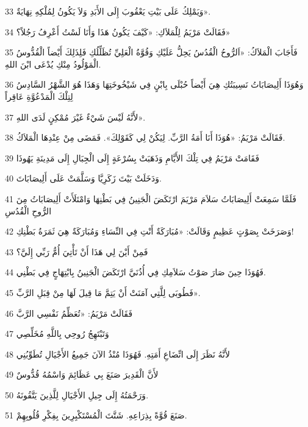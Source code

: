 \par 33 وَيَمْلِكُ عَلَى بَيْتِ يَعْقُوبَ إِلَى الأَبَدِ وَلاَ يَكُونُ لِمُلْكِهِ نِهَايَةٌ».
\par 34 فَقَالَتْ مَرْيَمُ لِلْمَلاَكِ: «كَيْفَ يَكُونُ هَذَا وَأَنَا لَسْتُ أَعْرِفُ رَجُلاً؟»
\par 35 فَأَجَابَ الْمَلاَكُ: «اَلرُّوحُ الْقُدُسُ يَحِلُّ عَلَيْكِ وَقُوَّةُ الْعَلِيِّ تُظَلِّلُكِ فَلِذَلِكَ أَيْضاً الْقُدُّوسُ الْمَوْلُودُ مِنْكِ يُدْعَى ابْنَ اللهِ.
\par 36 وَهُوَذَا أَلِيصَابَاتُ نَسِيبَتُكِ هِيَ أَيْضاً حُبْلَى بِابْنٍ فِي شَيْخُوخَتِهَا وَهَذَا هُوَ الشَّهْرُ السَّادِسُ لِتِلْكَ الْمَدْعُوَّةِ عَاقِراً
\par 37 لأَنَّهُ لَيْسَ شَيْءٌ غَيْرَ مُمْكِنٍ لَدَى اللهِ».
\par 38 فَقَالَتْ مَرْيَمُ: «هُوَذَا أَنَا أَمَةُ الرَّبِّ. لِيَكُنْ لِي كَقَوْلِكَ». فَمَضَى مِنْ عِنْدِهَا الْمَلاَكُ.
\par 39 فَقَامَتْ مَرْيَمُ فِي تِلْكَ الأَيَّامِ وَذَهَبَتْ بِسُرْعَةٍ إِلَى الْجِبَالِ إِلَى مَدِينَةِ يَهُوذَا
\par 40 وَدَخَلَتْ بَيْتَ زَكَرِيَّا وَسَلَّمَتْ عَلَى أَلِيصَابَاتَ.
\par 41 فَلَمَّا سَمِعَتْ أَلِيصَابَاتُ سَلاَمَ مَرْيَمَ ارْتَكَضَ الْجَنِينُ فِي بَطْنِهَا وَامْتَلَأَتْ أَلِيصَابَاتُ مِنَ الرُّوحِ الْقُدُسِ
\par 42 وَصَرَخَتْ بِصَوْتٍ عَظِيمٍ وَقَالَتْ: «مُبَارَكَةٌ أَنْتِ فِي النِّسَاءِ وَمُبَارَكَةٌ هِيَ ثَمَرَةُ بَطْنِكِ!
\par 43 فَمِنْ أَيْنَ لِي هَذَا أَنْ تَأْتِيَ أُمُّ رَبِّي إِلَيَّ؟
\par 44 فَهُوَذَا حِينَ صَارَ صَوْتُ سَلاَمِكِ فِي أُذُنَيَّ ارْتَكَضَ الْجَنِينُ بِابْتِهَاجٍ فِي بَطْنِي.
\par 45 فَطُوبَى لِلَّتِي آمَنَتْ أَنْ يَتِمَّ مَا قِيلَ لَهَا مِنْ قِبَلِ الرَّبِّ».
\par 46 فَقَالَتْ مَرْيَمُ: «تُعَظِّمُ نَفْسِي الرَّبَّ
\par 47 وَتَبْتَهِجُ رُوحِي بِاللَّهِ مُخَلِّصِي
\par 48 لأَنَّهُ نَظَرَ إِلَى اتِّضَاعِ أَمَتِهِ. فَهُوَذَا مُنْذُ الآنَ جَمِيعُ الأَجْيَالِ تُطَوِّبُنِي
\par 49 لأَنَّ الْقَدِيرَ صَنَعَ بِي عَظَائِمَ وَاسْمُهُ قُدُّوسٌ
\par 50 وَرَحْمَتُهُ إِلَى جِيلِ الأَجْيَالِ لِلَّذِينَ يَتَّقُونَهُ.
\par 51 صَنَعَ قُوَّةً بِذِرَاعِهِ. شَتَّتَ الْمُسْتَكْبِرِينَ بِفِكْرِ قُلُوبِهِمْ.
